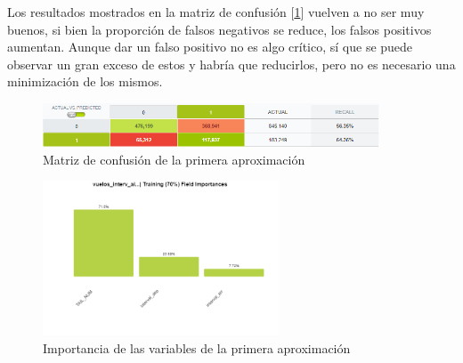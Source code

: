 \documentclass[format=acmsmall, review=false, screen=true]{acmart}
\begin{document}
Los resultados mostrados en la matriz de confusión [\ref{fig:ConfMatrixAprox2}] vuelven a no ser muy buenos, si bien la proporción de falsos negativos se reduce, los falsos positivos aumentan. Aunque dar un falso positivo no es algo crítico, sí que se puede observar un gran exceso de estos y habría que reducirlos, pero no es necesario una minimización de los mismos.

\begin{figure}[htb]
	\centering
	\includegraphics[width=10cm]{ConfMatrixAprox2.png}
	\caption{Matriz de confusión de la primera aproximación}
	\label{fig:ConfMatrixAprox2}
\end{figure}

\begin{figure}[htb]
	\centering
	\includegraphics[width=7cm]{ImportanciaAprox2.png}
	\caption{Importancia de las variables de la primera aproximación}
	\label{fig:ImportanciaAprox2}
\end{figure}
\end{document}
